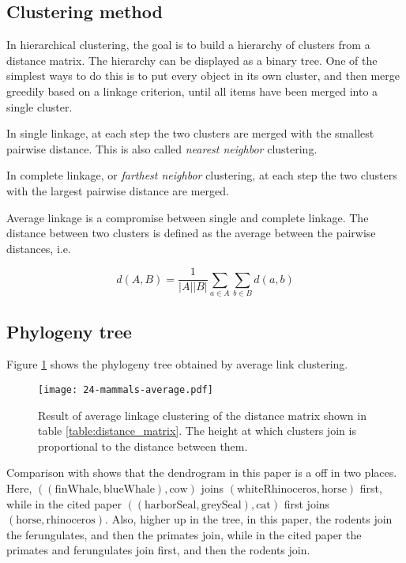 \subsection{Clustering method}

In hierarchical clustering, the goal is to build a hierarchy of clusters from a distance matrix. The hierarchy can be displayed as a binary tree. One of the simplest ways to do this is to put every object in its own cluster, and then merge greedily based on a linkage criterion, until all items have been merged into a single cluster.

In single linkage, at each step the two clusters are merged with the smallest pairwise distance. This is also called \emph{nearest neighbor} clustering.

In complete linkage, or \emph{farthest neighbor} clustering, at each step the two clusters with the largest pairwise distance are merged.

Average linkage is a compromise between single and complete linkage. The distance between two clusters is defined as the average between the pairwise distances, i.e.

$$ d(A, B) = \frac{1}{|A||B|} \sum_{a \in A}\sum_{b \in B} d(a, b) $$

\subsection{Phylogeny tree}

Figure \ref{figure:dendrogram_mammals} shows the phylogeny tree obtained by average link clustering.

\begin{figure}[h!]
  \texttt{[image: 24-mammals-average.pdf]}
  \caption{Result of average linkage clustering of the distance matrix shown in table \ref{table:distance_matrix}. The height at which clusters join is proportional to the distance between them. }
  \label{figure:dendrogram_mammals}
\end{figure}

Comparison with \cite{Cao1998} shows that the dendrogram in this paper is a off in two places. Here, $((\text{finWhale}, \text{blueWhale}), \text{cow})$ joins $(\text{whiteRhinoceros}, \text{horse})$ first, while in the cited paper $((\text{harborSeal}, \text{greySeal}), \text{cat})$ first joins $(\text{horse}, \text{rhinoceros})$. Also, higher up in the tree, in this paper, the rodents join the ferungulates, and then the primates join, while in the cited paper the primates and ferungulates join first, and then the rodents join.

